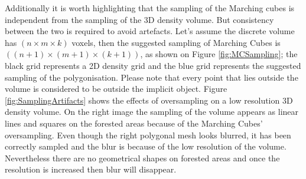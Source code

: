 \documentclass{subfiles}
\begin{document}
\par Additionally it is worth highlighting that the sampling of the Marching cubes is independent from the sampling of the 3D density volume. But consistency between the two is required to avoid artefacts. Let’s assume the discrete volume has $(n \times m \times k)$ voxels, then the suggested sampling of Marching Cubes is $((n+1) \times (m+1) \times (k+1))$, as shown on Figure \ref{fig:MCSampling}; the black grid represents a 2D density grid and the blue grid represents the suggested sampling of the polygonisation. Please note that every point that lies outside the volume is considered to be outside the implicit object. {\color{Fuchsia} Figure \ref{fig:SamplingArtifacts} shows the effects of oversampling on a low resolution 3D density volume. On the right image the sampling of the volume appears as linear lines and squares on the forested areas because of the Marching Cubes' oversampling. Even though the right polygonal mesh looks blurred, it has been correctly sampled and the blur is because of the low resolution of the volume. Nevertheless there are no geometrical shapes on forested areas and once the resolution is increased then blur will disappear. }
\end{document}
